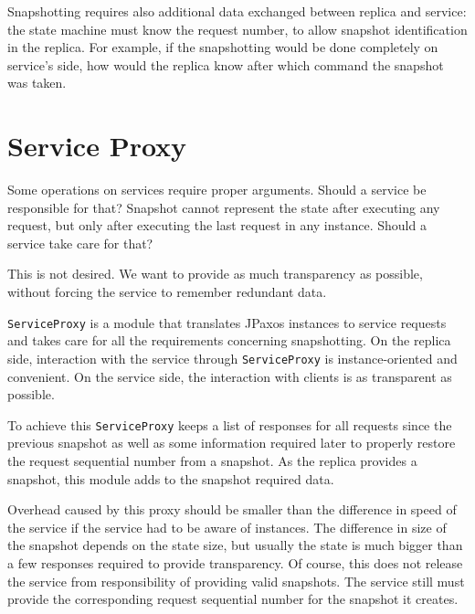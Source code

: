 Snapshotting requires also additional data exchanged between replica and service: the state machine must know the request number, to allow snapshot identification in the replica. For example, if the snapshotting would be done completely on service's side, how would the replica know after which command the snapshot was taken.


\section{Service Proxy}
\label{sec:serviceProxy}

Some operations on services require proper arguments. Should a service be responsible for that? Snapshot cannot represent the state after executing any request, but only after executing the last request in any instance. Should a service take care for that?

This is not desired. We want to provide as much transparency as possible, without forcing the service to remember redundant data.

\texttt{ServiceProxy} is a module that translates JPaxos instances to service requests and takes care for all the requirements concerning snapshotting. On the replica side, interaction with the service through \texttt{ServiceProxy} is instance-oriented and convenient. On the service side, the interaction with clients is as transparent as possible.

To achieve this \texttt{ServiceProxy} keeps a list of responses for all requests since the previous snapshot as well as some information required later to properly restore the
request sequential number %
from a snapshot.
As the replica provides a snapshot, this module adds to the snapshot required data.

Overhead caused by this proxy should be smaller than the difference in speed of the service if the service had to be aware of instances. The difference in size of the snapshot depends on the state size, but usually the state is much bigger than a few responses required to provide transparency.
Of course, this does not release the service from responsibility of providing valid snapshots. The service still must provide the corresponding 
request sequential number %
for the snapshot it creates.

